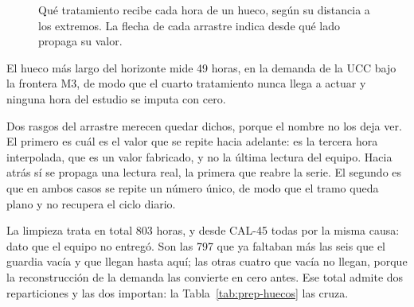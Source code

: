 \begin{figure}[H]
 \caption[La cascada sobre las horas de un hueco]{Qué tratamiento recibe
 cada hora de un hueco, según su distancia a los extremos. La flecha de
 cada arrastre indica desde qué lado propaga su valor.}
 \label{fig:prep-cascada}
\end{figure}


El hueco más largo del horizonte mide 49 horas, en la demanda de la UCC
bajo la frontera M3, de modo que el cuarto tratamiento nunca llega a
actuar y ninguna hora del estudio se imputa con cero.

Dos rasgos del arrastre merecen quedar dichos, porque el nombre no los
deja ver. El primero es cuál es el valor que se repite hacia adelante: es
la tercera hora interpolada, que es un valor fabricado, y no la última
lectura del equipo. Hacia atrás sí se propaga una lectura real, la primera
que reabre la serie. El segundo es que en ambos casos se repite un número
único, de modo que el tramo queda plano y no recupera el ciclo diario.

La limpieza trata en total \num{803} horas, y desde CAL-45 todas por la
misma causa: dato que el equipo no entregó. Son las \num{797} que ya
faltaban más las seis que el guardia vacía y que llegan hasta aquí; las
otras cuatro que vacía no llegan, porque la reconstrucción de la demanda
las convierte en cero antes. Ese total admite dos reparticiones y las dos
importan: la Tabla~\ref{tab:prep-huecos} las cruza.

